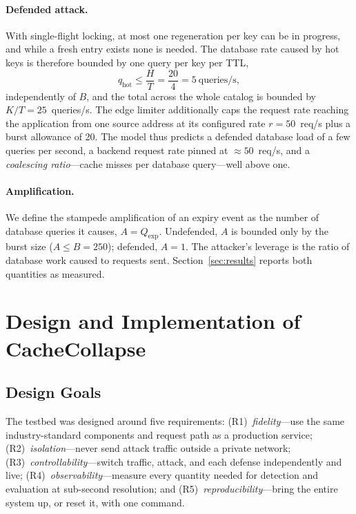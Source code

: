 \documentclass[preprint,12pt]{elsarticle}
\begin{document}
\paragraph{Defended attack.} With single-flight locking, at most one regeneration per
key can be in progress, and while a fresh entry exists none is needed. The database
rate caused by hot keys is therefore bounded by one query per key per TTL,
\begin{equation}
q_{\mathrm{hot}} \le \frac{H}{T} = \frac{20}{4} = 5~\text{queries/s},
\label{eq:defended}
\end{equation}
independently of $B$, and the total across the whole catalog is bounded by
$K/T=25$~queries/s. The edge limiter additionally caps the request rate reaching the
application from one source address at its configured rate $r=50$~req/s plus a burst
allowance of 20. The model thus predicts a defended database load of a few queries per
second, a backend request rate pinned at ${\approx}50$~req/s, and a \emph{coalescing
ratio}---cache misses per database query---well above one.

\paragraph{Amplification.} We define the stampede amplification of an expiry event as
the number of database queries it causes, $A=Q_{\mathrm{exp}}$. Undefended, $A$ is
bounded only by the burst size ($A\le B=250$); defended, $A=1$. The attacker's leverage
is the ratio of database work caused to requests sent. Section~\ref{sec:results}
reports both quantities as measured.

\section{Design and Implementation of CacheCollapse}
\label{sec:design}

\subsection{Design Goals}
The testbed was designed around five requirements: (R1)~\emph{fidelity}---use the same
industry-standard components and request path as a production service;
(R2)~\emph{isolation}---never send attack traffic outside a private network;
(R3)~\emph{controllability}---switch traffic, attack, and each defense independently
and live; (R4)~\emph{observability}---measure every quantity needed for detection and
evaluation at sub-second resolution; and (R5)~\emph{reproducibility}---bring the entire
system up, or reset it, with one command.
\end{document}
